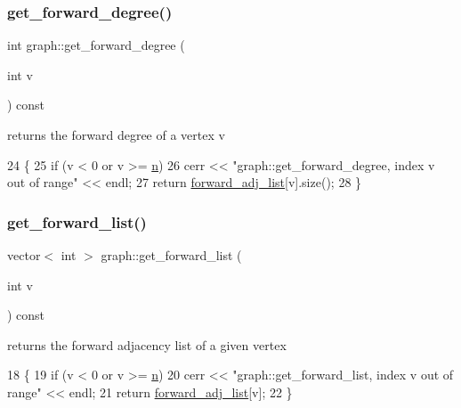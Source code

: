 \subsubsection{\texorpdfstring{get\+\_\+forward\+\_\+degree()}{get\_forward\_degree()}}
{\footnotesize\ttfamily int graph\+::get\+\_\+forward\+\_\+degree (\begin{DoxyParamCaption}\item[{int}]{v }\end{DoxyParamCaption}) const}



returns the forward degree of a vertex v 


\begin{DoxyCode}
24                                         \{
25   \textcolor{keywordflow}{if} (v < 0 or v >= \hyperlink{classgraph_ac8b3474ce95c04087c312508ec1443b6}{n})
26     cerr << \textcolor{stringliteral}{"graph::get\_forward\_degree, index v out of range"} << endl;
27   \textcolor{keywordflow}{return} \hyperlink{classgraph_a7d6441850d586d6a99fb73df57b70362}{forward\_adj\_list}[v].size();
28 \}
\end{DoxyCode}
\mbox{\label{classgraph_aa8fbee52a7b3604dbbd9175040c7ead5}} 
\subsubsection{\texorpdfstring{get\+\_\+forward\+\_\+list()}{get\_forward\_list()}}
{\footnotesize\ttfamily vector$<$ int $>$ graph\+::get\+\_\+forward\+\_\+list (\begin{DoxyParamCaption}\item[{int}]{v }\end{DoxyParamCaption}) const}



returns the forward adjacency list of a given vertex 


\begin{DoxyCode}
18                                               \{
19   \textcolor{keywordflow}{if} (v < 0 or v >= \hyperlink{classgraph_ac8b3474ce95c04087c312508ec1443b6}{n})
20     cerr << \textcolor{stringliteral}{"graph::get\_forward\_list, index v out of range"} << endl;
21   \textcolor{keywordflow}{return} \hyperlink{classgraph_a7d6441850d586d6a99fb73df57b70362}{forward\_adj\_list}[v];
22 \}
\end{DoxyCode}
\mbox{\label{classgraph_a70a6e0e4e0a874ab122405abd38f83cd}} 
